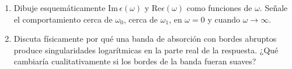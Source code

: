 \documentclass[]{article}
\numberwithin{equation}{section}
\begin{document}
\begin{enumerate}
\begin{enumerate}
		
		\item[4.] Dibuje esquemáticamente $\mathrm{Im} \, \epsilon(\omega)$ y $\mathrm{Re} \epsilon(\omega)$ como funciones de $\omega$. Señale el comportamiento cerca de $\omega_0$, cerca de $\omega_1$, en $\omega = 0$ y cuando $\omega \to \infty$.
		\resp
		
		
		\item[5.] Discuta físicamente por qué una banda de absorción con bordes abruptos produce singularidades logarítmicas en la parte real de la respuesta. ¿Qué cambiaría cualitativamente si los bordes de la banda fueran suaves?
		\resp
		
		
	\end{enumerate}
	
\end{enumerate}
\end{document}
